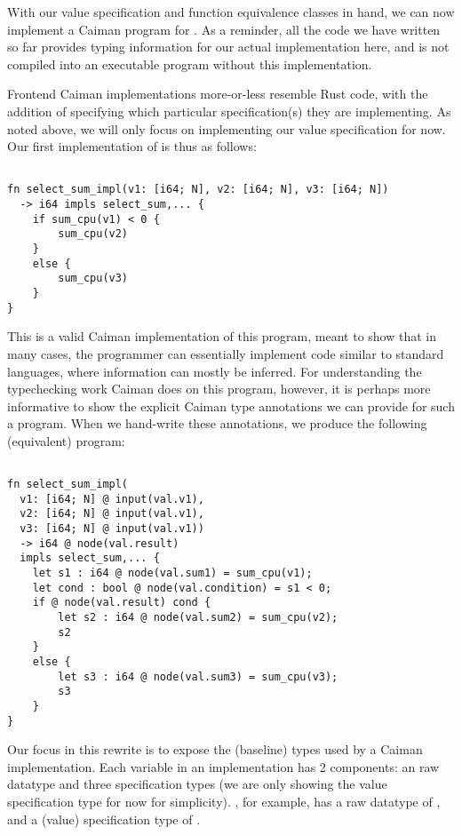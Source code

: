 With our value specification and function equivalence classes in hand, we can now implement a Caiman program for .  As a reminder, all the code we have written so far provides typing information for our actual implementation here, and is not compiled into an executable program without this implementation.

Frontend Caiman implementations more-or-less resemble Rust code, with the addition of specifying which particular specification(s) they are implementing.  As noted above, we will only focus on implementing our value specification for now.  Our first implementation of  is thus as follows:
%
\begin{lstlisting}

fn select_sum_impl(v1: [i64; N], v2: [i64; N], v3: [i64; N]) 
  -> i64 impls select_sum,... {
    if sum_cpu(v1) < 0 { 
        sum_cpu(v2)
    }
    else {
        sum_cpu(v3)
    }
}
\end{lstlisting}
%
This is a valid Caiman implementation of this program, meant to show that in many cases, the programmer can essentially implement code similar to standard languages, where information can mostly be inferred.  For understanding the typechecking work Caiman does on this program, however, it is perhaps more informative to show the explicit Caiman type annotations we can provide for such a program.  When we hand-write these annotations, we produce the following (equivalent) program:
%
\begin{lstlisting}

fn select_sum_impl(
  v1: [i64; N] @ input(val.v1), 
  v2: [i64; N] @ input(val.v1), 
  v3: [i64; N] @ input(val.v1)) 
  -> i64 @ node(val.result)
  impls select_sum,... {
    let s1 : i64 @ node(val.sum1) = sum_cpu(v1);
    let cond : bool @ node(val.condition) = s1 < 0;
    if @ node(val.result) cond { 
        let s2 : i64 @ node(val.sum2) = sum_cpu(v2);
        s2
    }
    else {
        let s3 : i64 @ node(val.sum3) = sum_cpu(v3);
        s3
    }
}
\end{lstlisting}
%
Our focus in this rewrite is to expose the (baseline) types used by a Caiman implementation.  Each variable in an implementation has 2 components: an raw datatype and three specification types (we are only showing the value specification type for now for simplicity).  , for example, has a raw datatype of , and a (value) specification type of .

